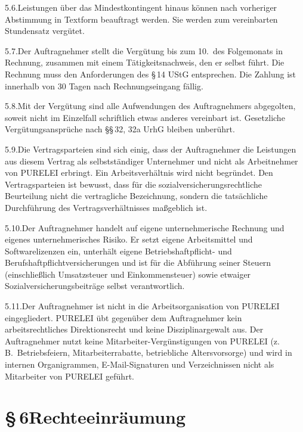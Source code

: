 \documentclass[11pt,a4paper]{article}
\newcommand{\ClientKurzname}{PURELEI}
\begin{document}
5.6.\quad Leistungen über das Mindestkontingent hinaus können nach vorheriger Abstimmung in Textform beauftragt werden. Sie werden zum vereinbarten Stundensatz vergütet.

5.7.\quad Der Auftragnehmer stellt die Vergütung bis zum 10.\ des Folgemonats in Rechnung, zusammen mit einem Tätigkeitsnachweis, den er selbst führt. Die Rechnung muss den Anforderungen des §\,14 UStG entsprechen. Die Zahlung ist innerhalb von 30 Tagen nach Rechnungseingang fällig.

5.8.\quad Mit der Vergütung sind alle Aufwendungen des Auftragnehmers abgegolten, soweit nicht im Einzelfall schriftlich etwas anderes vereinbart ist. Gesetzliche Vergütungsansprüche nach §§\,32, 32a UrhG bleiben unberührt.

5.9.\quad Die Vertragsparteien sind sich einig, dass der Auftragnehmer die Leistungen aus diesem Vertrag als selbstständiger Unternehmer und nicht als Arbeitnehmer von \ClientKurzname{} erbringt. Ein Arbeitsverhältnis wird nicht begründet. Den Vertragsparteien ist bewusst, dass für die sozialversicherungsrechtliche Beurteilung nicht die vertragliche Bezeichnung, sondern die tatsächliche Durchführung des Vertragsverhältnisses maßgeblich ist.

5.10.\quad Der Auftragnehmer handelt auf eigene unternehmerische Rechnung und eigenes unternehmerisches Risiko. Er setzt eigene Arbeitsmittel und Softwarelizenzen ein, unterhält eigene Betriebshaftpflicht- und Berufshaftpflichtversicherungen und ist für die Abführung seiner Steuern (einschließlich Umsatzsteuer und Einkommensteuer) sowie etwaiger Sozialversicherungsbeiträge selbst verantwortlich.

5.11.\quad Der Auftragnehmer ist nicht in die Arbeitsorganisation von \ClientKurzname{} eingegliedert. \ClientKurzname{} übt gegenüber dem Auftragnehmer kein arbeitsrechtliches Direktionsrecht und keine Disziplinargewalt aus. Der Auftragnehmer nutzt keine Mitarbeiter-Vergünstigungen von \ClientKurzname{} (z.\,B.\ Betriebsfeiern, Mitarbeiterrabatte, betriebliche Altersvorsorge) und wird in internen Organigrammen, E-Mail-Signaturen und Verzeichnissen nicht als Mitarbeiter von \ClientKurzname{} geführt.

\section{§\,6\quad Rechteeinräumung}
\end{document}
